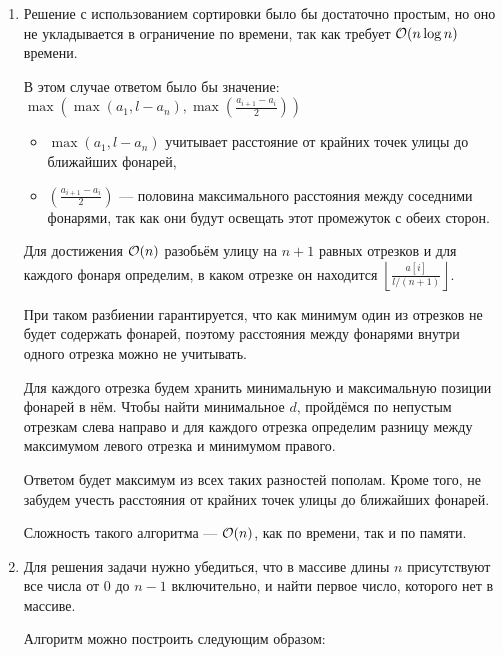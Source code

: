 \begin{enumerate}

    \item
        Решение с использованием сортировки было бы достаточно простым, но оно не укладывается в ограничение по времени,
        так как требует $\mathcal{O}(n \log n)$ времени.

        В этом случае ответом было бы значение: $\max\left(\max(a_1, l - a_n), \max\left(\frac{a_{i+1} - a_i}{2}\right)\right)$

        \begin{itemize}

            \item
                $\max(a_1, l - a_n)$ учитывает расстояние от крайних точек улицы до ближайших фонарей,

            \item
                $(\frac{a_{i+1} - a_i}{2})$ — половина максимального расстояния между соседними фонарями,
                так как они будут освещать этот промежуток с обеих сторон.

        \end{itemize}

        Для достижения $\mathcal{O}(n)$ разобьём улицу на $n + 1$ равных отрезков и для каждого фонаря определим,
        в каком отрезке он находится $\left\lfloor \frac{a[i]}{l / (n + 1)} \right\rfloor$.

        При таком разбиении гарантируется, что как минимум один из отрезков
        не будет содержать фонарей, поэтому расстояния между фонарями внутри одного отрезка можно не учитывать.

        Для каждого отрезка будем хранить минимальную и максимальную позиции фонарей в нём.
        Чтобы найти минимальное $d$, пройдёмся по непустым отрезкам слева направо и для каждого отрезка
        определим разницу между максимумом левого отрезка и минимумом правого.

        Ответом будет максимум из всех таких разностей пополам.
        Кроме того, не забудем учесть расстояния от крайних точек улицы до ближайших фонарей.

        Сложность такого алгоритма — $\mathcal{O}(n)$, как по времени, так и по памяти.

    \item
        Для решения задачи нужно убедиться, что в массиве длины $n$ присутствуют все числа от $0$ до $n-1$ включительно,
        и найти первое число, которого нет в массиве.

        Алгоритм можно построить следующим образом:


\end{enumerate}
